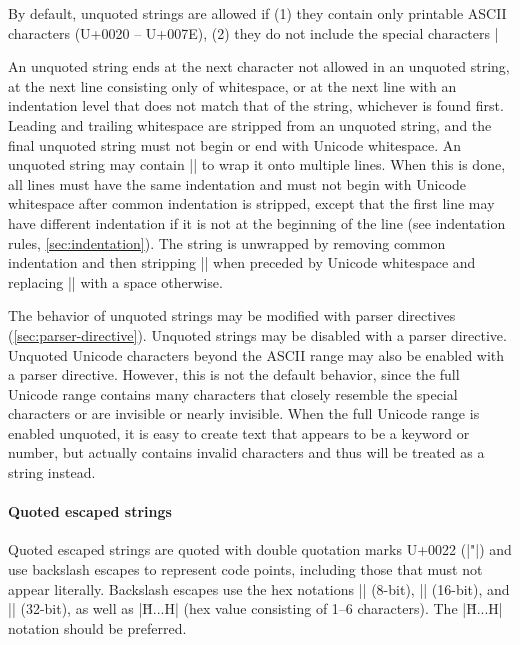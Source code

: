\documentclass[11pt]{article}
\begin{document}
By default, unquoted strings are allowed if (1) they contain only printable ASCII characters (U+0020 -- U+007E), (2) they do not include the special characters |%

An unquoted string ends at the next character not allowed in an unquoted string, at the next line consisting only of whitespace, or at the next line with an indentation level that does not match that of the string, whichever is found first.  Leading and trailing whitespace are stripped from an unquoted string, and the final unquoted string must not begin or end with Unicode whitespace.  An unquoted string may contain |\n| to wrap it onto multiple lines.  When this is done, all lines must have the same indentation and must not begin with Unicode whitespace after common indentation is stripped, except that the first line may have different indentation if it is not at the beginning of the line (see indentation rules, \cref{sec:indentation}).  The string is unwrapped by removing common indentation and then stripping |\n| when preceded by Unicode whitespace and replacing |\n| with a space otherwise.

The behavior of unquoted strings may be modified with parser directives (\cref{sec:parser-directive}).  Unquoted strings may be disabled with a parser directive.  Unquoted Unicode characters beyond the ASCII range may also be enabled with a parser directive.  However, this is not the default behavior, since the full Unicode range contains many characters that closely resemble the special characters or are invisible or nearly invisible.  When the full Unicode range is enabled unquoted, it is easy to create text that appears to be a keyword or number, but actually contains invalid characters and thus will be treated as a string instead.


\paragraph{Quoted escaped strings}

Quoted escaped strings are quoted with double quotation marks U+0022 (|"|) and use backslash escapes to represent code points, including those that must not appear literally.  Backslash escapes use the hex notations |\xHH| (8-bit), |\uHHHH| (16-bit), and |\UHHHHHHHH| (32-bit), as well as |\u{H...H}| (hex value consisting of 1--6 characters).  The |\u{H...H}| notation should be preferred.
\end{document}
